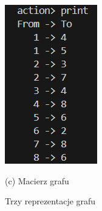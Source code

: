 \documentclass{article}
\begin{document}
\begin{figure}[htbp]
\begin{minipage}[b]{0.3\textwidth}
			\includegraphics[width=\textwidth]{reprezentacja_table_k.png}
			\par\small (c) Macierz grafu
		\end{minipage}
		\caption{Trzy reprezentacje grafu}
		\label{fig:trzy-obrazki}
	\end{figure}
	
	
	
\end{document}
